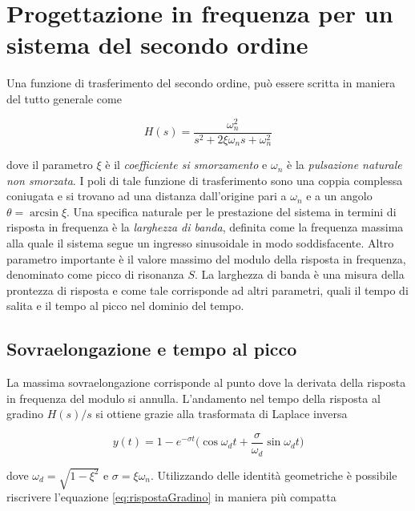 \section{Progettazione in frequenza per un sistema del secondo ordine}
	\label{app:sistemaSecondoordine}
	
	Una funzione di trasferimento del secondo ordine, può essere scritta in maniera del tutto generale come
	
	\begin{equation}
		H(s)=\frac{\omega_n^2}{s^2 + 2\xi \omega_ns + \omega_n^2}
		\label{eq:secondoOrdine}
	\end{equation}
	
	\noindent dove il parametro $\xi$ è il \textit{coefficiente si smorzamento} e $\omega_n$ è la \textit{pulsazione naturale non smorzata}. I poli di tale funzione di trasferimento sono una coppia complessa coniugata e si trovano ad una distanza dall'origine pari a $\omega_n$ e a un angolo $\theta=\arcsin\xi$. Una specifica naturale per le prestazione del sistema in termini di risposta in frequenza è la \textit{larghezza di banda}, definita come la frequenza massima alla quale il  sistema segue un ingresso sinusoidale in modo soddisfacente. Altro parametro importante è il valore massimo del modulo della  risposta in frequenza, denominato come picco di risonanza $S$. La larghezza di banda è una misura della prontezza di risposta e come tale corrisponde ad altri parametri, quali il tempo di salita e il tempo al picco nel dominio del tempo.
	
	\subsection{Sovraelongazione e tempo al picco}
		\label{subapp:sovraelongazionePicco}
		
		La massima sovraelongazione corrisponde al punto dove la derivata della risposta in frequenza del modulo si annulla. L'andamento nel tempo della risposta al gradino $H(s)/s$ si ottiene grazie alla trasformata di Laplace inversa
		
		\begin{equation}
			y(t) = 1 - e^{-\sigma t} \Big( \cos\omega_dt + \frac{\sigma}{\omega_d}\sin\omega_dt   \Big)
			\label{eq:rispostaGradino}
		\end{equation}  
		
		\noindent dove $\omega_d=\sqrt{1-\xi^2}$ e $\sigma=\xi\omega_n$. Utilizzando delle identità geometriche è possibile riscrivere l'equazione \ref{eq:rispostaGradino} in maniera più compatta
		

